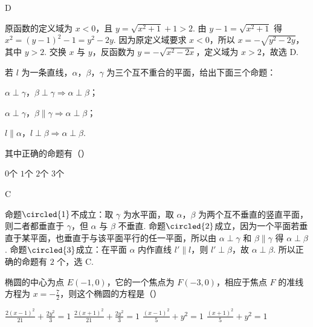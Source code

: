 \begin{answer}
D
\end{answer}

\begin{solution}
原函数的定义域为 \(x<0\)，且 \(y=\sqrt{x^2+1}+1>2\). 由 \(y-1=\sqrt{x^2+1}\) 得 \(x^2=(y-1)^2-1=y^2-2y\). 因为原定义域要求 \(x<0\)，所以 \(x=-\sqrt{y^2-2y}\)，其中 \(y>2\). 交换 \(x\) 与 \(y\)，反函数为 \(y=-\sqrt{x^2-2x}\)，定义域为 \(x>2\)，故选 D.
\end{solution}

\begin{problem}
若 \(l\) 为一条直线，\(\alpha\)，\(\beta\)，\(\gamma\) 为三个互不重合的平面，给出下面三个命题：

\begin{circlelist}
\item \(\alpha \perp \gamma\)，\(\beta \perp \gamma \Rightarrow \alpha \perp \beta\)；
\item \(\alpha \perp \gamma\)，\(\beta \parallel \gamma \Rightarrow \alpha \perp \beta\)；
\item \(l \parallel \alpha\)，\(l \perp \beta \Rightarrow \alpha \perp \beta\).
\end{circlelist}

其中正确的命题有（\quad）

\choices
    {\(0\)个}
    {\(1\)个}
    {\(2\)个}
    {\(3\)个}
\end{problem}

\begin{answer}
C
\end{answer}

\begin{solution}
命题\(\circled{1}\)不成立：取 \(\gamma\) 为水平面，取 \(\alpha\)，\(\beta\) 为两个互不垂直的竖直平面，则二者都垂直于 \(\gamma\)，但 \(\alpha\) 与 \(\beta\) 不垂直. 命题\(\circled{2}\)成立，因为一个平面若垂直于某平面，也垂直于与该平面平行的任一平面，所以由 \(\alpha\perp\gamma\) 和 \(\beta\parallel\gamma\) 得 \(\alpha\perp\beta\).
命题\(\circled{3}\)成立：在平面 \(\alpha\) 内作直线 \(l'\parallel l\)，则 \(l'\perp\beta\)，故 \(\alpha\perp\beta\). 所以正确的命题有 \(2\) 个，选 C.
\end{solution}

\begin{problem}
椭圆的中心为点 \(E(-1,0)\)，它的一个焦点为 \(F(-3,0)\)，相应于焦点 \(F\) 的准线方程为 \(x = -\frac{7}{2}\)，则这个椭圆的方程是（\quad）

\choices
    {\(\frac{2(x - 1)^2}{21} + \frac{2y^2}{3} = 1\)}
    {\(\frac{2(x + 1)^2}{21} + \frac{2y^2}{3} = 1\)}
    {\(\frac{(x - 1)^2}{5} + y^2 = 1\)}
    {\(\frac{(x + 1)^2}{5} + y^2 = 1\)}
\end{problem}

